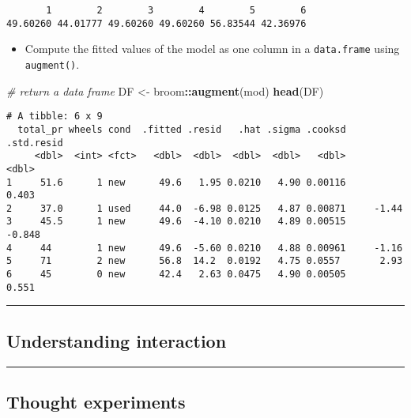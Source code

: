\documentclass[
]{book}
\newenvironment{Shaded}{\begin{snugshade}}{\end{snugshade}}
\newcommand{\CommentTok}[1]{\textcolor[rgb]{0.56,0.35,0.01}{\textit{#1}}}
\newcommand{\KeywordTok}[1]{\textcolor[rgb]{0.13,0.29,0.53}{\textbf{#1}}}
\newcommand{\NormalTok}[1]{#1}
\newcommand{\OperatorTok}[1]{\textcolor[rgb]{0.81,0.36,0.00}{\textbf{#1}}}
\newcommand{\StringTok}[1]{\textcolor[rgb]{0.31,0.60,0.02}{#1}}
\providecommand{\tightlist}{%
  \setlength{\itemsep}{0pt}\setlength{\parskip}{0pt}}
\begin{document}
\begin{verbatim}
       1        2        3        4        5        6 
49.60260 44.01777 49.60260 49.60260 56.83544 42.36976 
\end{verbatim}

\begin{itemize}
\tightlist
\item
  Compute the fitted values of the model as one column in a \texttt{data.frame} using \texttt{augment()}.
\end{itemize}

\begin{Shaded}
\begin{Highlighting}[]
\CommentTok{# return a data frame}
\NormalTok{DF <-}\StringTok{ }\NormalTok{broom}\OperatorTok{::}\KeywordTok{augment}\NormalTok{(mod)}
\KeywordTok{head}\NormalTok{(DF)}
\end{Highlighting}
\end{Shaded}

\begin{verbatim}
# A tibble: 6 x 9
  total_pr wheels cond  .fitted .resid   .hat .sigma .cooksd .std.resid
     <dbl>  <int> <fct>   <dbl>  <dbl>  <dbl>  <dbl>   <dbl>      <dbl>
1     51.6      1 new      49.6   1.95 0.0210   4.90 0.00116      0.403
2     37.0      1 used     44.0  -6.98 0.0125   4.87 0.00871     -1.44 
3     45.5      1 new      49.6  -4.10 0.0210   4.89 0.00515     -0.848
4     44        1 new      49.6  -5.60 0.0210   4.88 0.00961     -1.16 
5     71        2 new      56.8  14.2  0.0192   4.75 0.0557       2.93 
6     45        0 new      42.4   2.63 0.0475   4.90 0.00505      0.551
\end{verbatim}

\begin{center}\rule{0.5\linewidth}{0.5pt}\end{center}

\hypertarget{understanding-interaction}{%
\subsection*{Understanding interaction}\label{understanding-interaction}}

\begin{center}\rule{0.5\linewidth}{0.5pt}\end{center}

\hypertarget{thought-experiments}{%
\subsection*{Thought experiments}\label{thought-experiments}}
\end{document}
